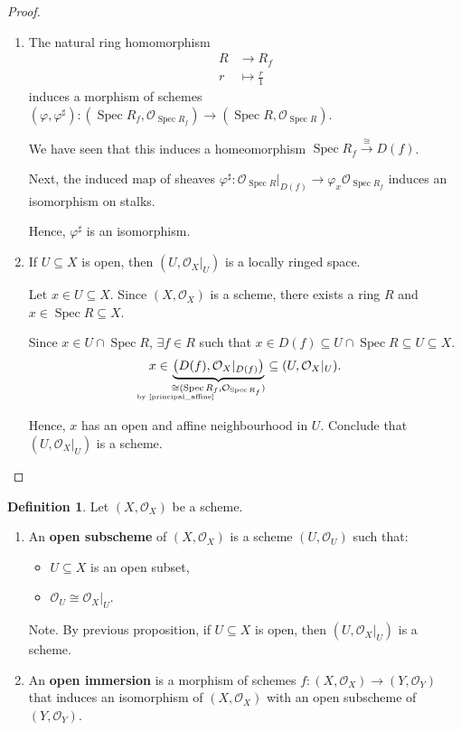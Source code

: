 \documentclass[12pt]{article}
\DeclareMathOperator{\Spec}{Spec}
\theoremstyle{definition}
\newtheorem*{definition}{Definition}
\begin{document}
\begin{proof}
\begin{enumerate}[label=\arabic*)]
\item The natural ring homomorphism
\begin{align*}
R&\longrightarrow R_f\\r&\longmapsto\frac r1
\end{align*}
induces a morphism of schemes $(\varphi,\varphi^\sharp):(\Spec R_f,\mathcal O_{\Spec R_f})\rightarrow(\Spec R,\mathcal O_{\Spec R})$.

We have seen that this induces a homeomorphism $\Spec R_f\xrightarrow\cong D(f)$.

Next, the induced map of sheaves $\varphi^\sharp:\mathcal O_{\Spec R}|_{D(f)}\longrightarrow\varphi_x\mathcal O_{\Spec R_f}$ induces an isomorphism on stalks.

Hence, $\varphi^\sharp$ is an isomorphism.

\item If $U\subseteq X$ is open, then $(U,\mathcal O_X|_U)$ is a locally ringed space.

Let $x\in U\subseteq X$. Since $(X,\mathcal O_X)$ is a scheme, there exists a ring $R$ and $x\in\Spec R\subseteq X$.

Since $x\in U\cap\Spec R$, $\exists f\in R$ such that $x\in D(f)\subseteq U\cap\Spec R\subseteq U\subseteq X$.
\[x\in\underbrace{\big(D(f),\mathcal O_X|_{D(f)}\big)}_{\underset{\mathclap{\text{by \ref{principal_affine}}}}\cong(\Spec R_f,\mathcal O_{\Spec R_f})}\subseteq(U,\mathcal O_X|_U).\]

Hence, $x$ has an open and affine neighbourhood in $U$. Conclude that $(U,\mathcal O_X|_U)$ is a scheme.
\end{enumerate}
\end{proof}

\begin{definition}
Let $(X,\mathcal O_X)$ be a scheme.

\begin{enumerate}[label=\arabic*)]
\item An \textbf{open subscheme} of $(X,\mathcal O_X)$ is a scheme $(U,\mathcal O_U)$ such that:
\begin{itemize}[label=$-$]
\item $U\subseteq X$ is an open subset,
\item $\mathcal O_U\cong\mathcal O_X|_U$.
\end{itemize}

Note. By previous proposition, if $U\subseteq X$ is open, then $(U,\mathcal O_X|_U)$ is a scheme.

\item An \textbf{open immersion} is a morphism of schemes $f:(X,\mathcal O_X)\rightarrow(Y,\mathcal O_Y)$ that induces an isomorphism of $(X,\mathcal O_X)$ with an open subscheme of $(Y,\mathcal O_Y)$.
\end{enumerate}
\end{definition}
\end{document}
